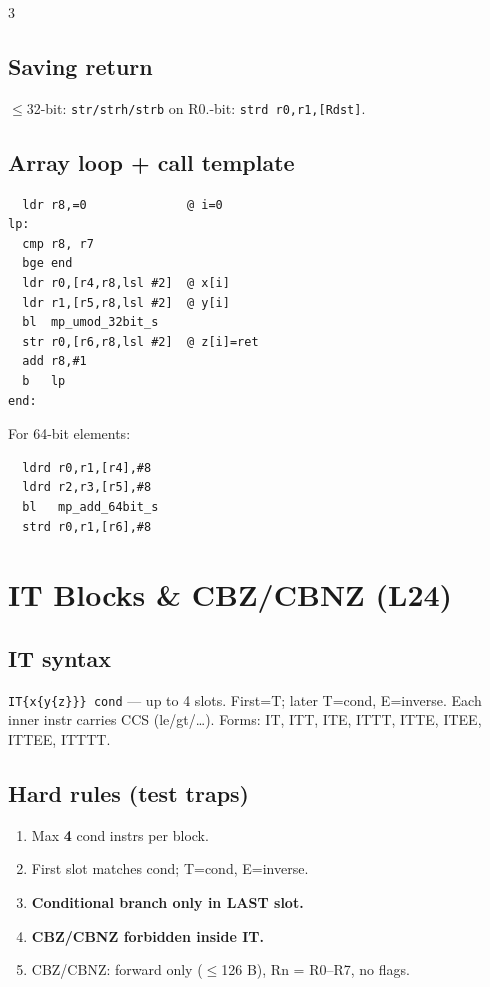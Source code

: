 \documentclass[8pt,landscape]{extarticle}
\newcommand{\asm}[1]{\texttt{\scriptsize #1}}
\begin{document}
\begin{multicols*}{3}
\subsection{Saving return}
$\le$32-bit: \asm{str/strh/strb} on R0.-bit: \asm{strd r0,r1,[Rdst]}.

\subsection{Array loop + call template}
\begin{lstlisting}
  ldr r8,=0              @ i=0
lp:
  cmp r8, r7
  bge end
  ldr r0,[r4,r8,lsl #2]  @ x[i]
  ldr r1,[r5,r8,lsl #2]  @ y[i]
  bl  mp_umod_32bit_s
  str r0,[r6,r8,lsl #2]  @ z[i]=ret
  add r8,#1
  b   lp
end:
\end{lstlisting}

For 64-bit elements:
\begin{lstlisting}
  ldrd r0,r1,[r4],#8
  ldrd r2,r3,[r5],#8
  bl   mp_add_64bit_s
  strd r0,r1,[r6],#8
\end{lstlisting}

\section{IT Blocks \& CBZ/CBNZ (L24)}

\subsection{IT syntax}
\asm{IT\{x\{y\{z\}\}\} cond} --- up to 4 slots. First=T; later T=cond, E=inverse. Each inner instr carries CCS (le/gt/\ldots). Forms: IT, ITT, ITE, ITTT, ITTE, ITEE, ITTEE, ITTTT.

\subsection{Hard rules (test traps)}
\begin{enumerate}
\item Max \textbf{4} cond instrs per block.
\item First slot matches cond; T=cond, E=inverse.
\item \textbf{Conditional branch only in LAST slot.}
\item \textbf{CBZ/CBNZ forbidden inside IT.}
\item CBZ/CBNZ: forward only ($\le$126 B), Rn = R0--R7, no flags.
\end{enumerate}


\end{multicols*}
\end{document}

